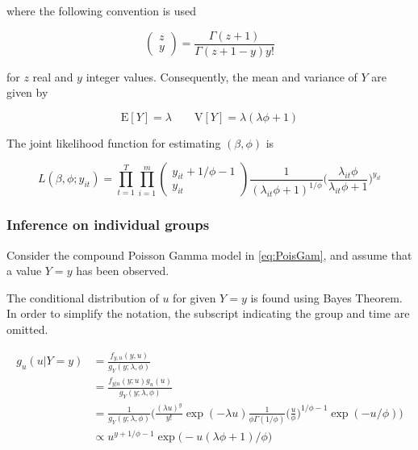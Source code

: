 \documentclass[preprint, 3p, authoryear]{elsarticle} %
\begin{document}
where the following convention is used

\begin{equation}
  \begin{pmatrix} z\\y \end{pmatrix} = \frac{\Gamma(z+1)}{\Gamma(z+1-y)y!}
\end{equation}

for \(z\) real and \(y\) integer values. Consequently, the mean and variance of \(Y\) are given by

\begin{equation}\label{eq:meanNB}
  \mathrm{E}[Y] = \lambda \qquad \mathrm{V}[Y] = \lambda (\lambda \phi + 1)
\end{equation}

The joint likelihood function for estimating \((\beta,\phi)\) is

\begin{equation}\label{eq:jnllPoisG}
  L( \beta, \phi; y_{it})=\prod_{t=1}^{T}\prod_{i=1}^{m} \begin{pmatrix} y_{it}+1/\phi-1 \\ y_{it} \end{pmatrix} \frac{1}{(\lambda_{it}\phi+1)^{1/\phi}}\bigg(\frac{\lambda_{it}\phi}{\lambda_{it}\phi+1}\bigg)^{y_{it}}
\end{equation}

\hypertarget{inference-on-individual-groups}{%
\subsubsection{Inference on individual groups}\label{inference-on-individual-groups}}

Consider the compound Poisson Gamma model in \ref{eq:PoisGam}, and assume that a value \(Y=y\) has been observed.

The conditional distribution of \(u\) for given \(Y=y\) is found using Bayes Theorem. In order to simplify the notation, the subscript indicating the group and time are omitted.

\begin{equation}
  \begin{aligned}
    g_{u}(u|Y=y)&=\frac{f_{y,u}(y,u)}{g_Y(y;\lambda, \phi)} \\
    &=\frac{f_{y|u}(y;u)g_{u}(u)}{g_{Y}(y;\lambda,\phi)} \\
    &=\frac{1}{g_{Y}(y;\lambda,\phi)}\Bigg(\frac{(\lambda u)^y}{y!} \exp (-\lambda u) \frac{1}{\phi \Gamma(1/\phi)} \bigg(\frac{u}{\phi}\bigg)^{1/\phi-1} \exp (-u/\phi)\Bigg) \\
    &\propto u^{y+1/\phi-1} \exp \big(- u(\lambda\phi+1)/\phi\big)
  \end{aligned}
\end{equation}
\end{document}
